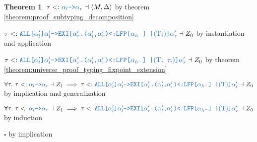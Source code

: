 \documentclass[acmsmall]{acmart}
\theoremstyle{definition}
\newtheorem{theorem}{Theorem}[section]
\begin{document}
\begin{theorem}
      \item \Z\Z\Z $
        \tau \subtypes \obj{$\alpha_l$->$\alpha_r$} \given\left<M, \Delta\right>
      $ by theorem \ref{theorem:proof_subtyping_decomposition}

      \item \Z\Z\Z $
        \tau
        \subtypes
        \obj{ALL[$\alpha_l'$]$\alpha_l'$->EXI[$\alpha_r'$.($\alpha_l'$,$\alpha_r'$)<:LFP[$\alpha_{h^-}$] |$(\Tau_i)$]$\alpha_r'$} 
        \given Z_0
      $ by instantiation and application 
      \item \Z\Z\Z $
        \tau
        \subtypes
        \obj{ALL[$\alpha_l'$]$\alpha_l'$->EXI[$\alpha_r'$.($\alpha_l'$,$\alpha_r'$)<:LFP[$\alpha_{h^-}$] |$(\Tau_i\ \tau_i)$]$\alpha_r'$} 
        \given Z_0
      $ by theorem \ref{theorem:universe_proof_typing_fixpoint_extension}
    \item \Z\Z $
      \forall \tau .\ 
      \tau \subtypes \obj{$\alpha_l$->$\alpha_r$} \given Z_1
      \implies
      \tau
      \subtypes
      \obj{ALL[$\alpha_l'$]$\alpha_l'$->EXI[$\alpha_r'$.($\alpha_l'$,$\alpha_r'$)<:LFP[$\alpha_{h^-}$] |$(\Tau)$]$\alpha_r'$} 
      \given Z_0
    $ by implication and generalization 


  \item \Z $
    \forall \tau .\ 
    \tau \subtypes \obj{$\alpha_l$->$\alpha_r$} \given Z_1
    \implies
    \tau
    \subtypes
    \obj{ALL[$\alpha_l'$]$\alpha_l'$->EXI[$\alpha_r'$.($\alpha_l'$,$\alpha_r'$)<:LFP[$\alpha_{h^-}$] |$(\Tau)$]$\alpha_r'$} 
    \given Z_0
  $ by induction
  \item $\square$ by implication
\end{theorem}
\end{document}
